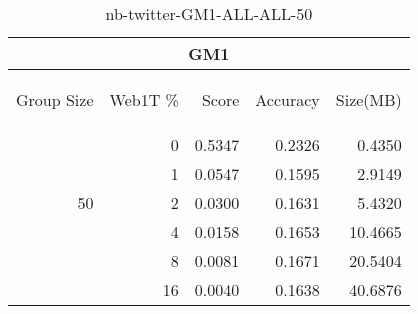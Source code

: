 \begin{center}
\begin{table}[htbp]
\begin{tabular}{ | r | r | r | r | r |}
\hline
\multicolumn{5}{|c|}{GM1}\\
\hline
\begin{sideways}Group Size\end{sideways} & \begin{sideways}Web1T \%\end{sideways} & \begin{sideways}Score\end{sideways} & \begin{sideways}Accuracy\end{sideways} & \begin{sideways}Size(MB)\end{sideways}\\
\hline
\multirow{5}{*}{50}
 & 0 & 0.5347 & 0.2326 & 0.4350\\ \cline{2-5}
 & 1 & 0.0547 & 0.1595 & 2.9149\\ \cline{2-5}
 & 2 & 0.0300 & 0.1631 & 5.4320\\ \cline{2-5}
 & 4 & 0.0158 & 0.1653 & 10.4665\\ \cline{2-5}
 & 8 & 0.0081 & 0.1671 & 20.5404\\ \cline{2-5}
 & 16 & 0.0040 & 0.1638 & 40.6876\\ \cline{2-5}
\hline
\end{tabular}
\caption{nb-twitter-GM1-ALL-ALL-50}
\label{table:nb-twitter-GM1-ALL-ALL-50}
\end{table}
\end{center}

